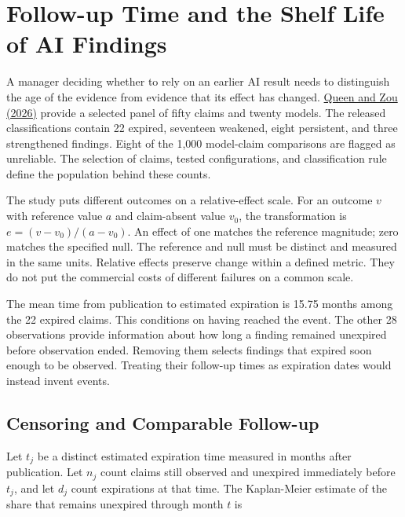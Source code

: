 \hypertarget{M02-follow-up-time-and-the-shelf-life-of-ai-findings}{%
\section{Follow-up Time and the Shelf Life of AI
Findings}\label{M02-follow-up-time-and-the-shelf-life-of-ai-findings}}

\noindent \noindent A manager deciding whether to rely on an earlier AI result
needs to distinguish the age of the evidence from evidence that its
effect has changed.
\href{https://zou-group.github.io/llm-claims-shelf-life/}{Queen and Zou
(2026)} provide a selected panel of fifty claims and twenty models. The
released classifications contain 22 expired, seventeen weakened, eight
persistent, and three strengthened findings. Eight of the 1,000
model-claim comparisons are flagged as unreliable. The selection of
claims, tested configurations, and classification rule define the
population behind these counts.

The study puts different outcomes on a relative-effect scale. For an
outcome \(v\) with reference value \(a\) and claim-absent value \(v_0\),
the transformation is \(e=(v-v_0)/(a-v_0)\). An effect of one matches
the reference magnitude; zero matches the specified null. The reference
and null must be distinct and measured in the same units. Relative
effects preserve change within a defined metric. They do not put the
commercial costs of different failures on a common scale.

The mean time from publication to estimated expiration is 15.75 months
among the 22 expired claims. This conditions on having reached the
event. The other 28 observations provide information about how long a
finding remained unexpired before observation ended. Removing them
selects findings that expired soon enough to be observed. Treating their
follow-up times as expiration dates would instead invent events.

\hypertarget{M02-censoring-and-comparable-follow-up}{%
\subsection{Censoring and Comparable
Follow-up}\label{M02-censoring-and-comparable-follow-up}}

\noindent \noindent Let \(t_j\) be a distinct estimated expiration time measured
in months after publication. Let \(n_j\) count claims still observed and
unexpired immediately before \(t_j\), and let \(d_j\) count expirations
at that time. The Kaplan-Meier estimate of the share that remains
unexpired through month \(t\) is

